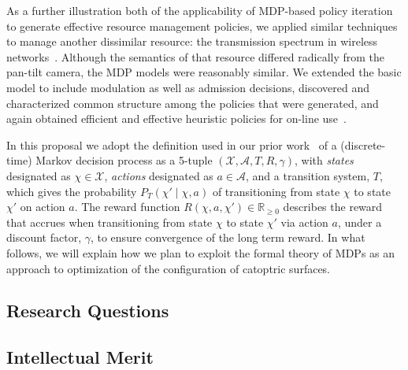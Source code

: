 As a further illustration both of the applicability of MDP-based
policy iteration to generate effective resource management policies,
we applied similar techniques to manage another dissimilar resource: 
the transmission spectrum in wireless networks~\cite{mskgct13}.  
Although the semantics of that resource differed radically from the pan-tilt camera, 
the MDP models were reasonably similar.  We extended the basic model to
include modulation as well as admission decisions, discovered and characterized
common structure among the policies that were generated, and again obtained
efficient and effective heuristic policies for on-line use~\cite{mgc16}.

In this proposal we adopt the definition used in our prior work~\cite{gtsg08}
of a (discrete-time) Markov decision process as a 5-tuple
$(\mathcal{X}, \mathcal{A}, T, R, \gamma)$, with \emph{states} designated
as $\chi \in \mathcal{X}$, \emph{actions} designated as $a \in \mathcal{A}$,
and a transition system, $T$, which gives the probability
$P_T (\chi' \mid \chi, a)$ of transitioning from state $\chi$ to
state $\chi'$ on action $a$.
The reward function $R(\chi, a, \chi') \in \mathbb R_{\ge 0}$ describes the
reward that accrues when transitioning from state $\chi$ to
state $\chi'$ via action $a$, under a discount factor, $\gamma$,
to ensure convergence of the long term reward.
In what follows, we will explain how we plan to exploit the formal theory of 
MDPs as an approach to optimization of the configuration of catoptric surfaces.

\subsection{Research Questions}

\subsection{Intellectual Merit}

